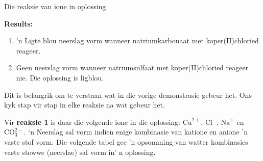 \begin{g_experiment}{Die reaksie van ione in oplossing}
\begin{enumerate}[noitemsep, label=\textbf{\arabic*}. ]
\end{enumerate}
        \par 
      \label{m38719*id340060}\noindent{}\textbf{Results:}
        \newline
      \label{m38719*id340067}\begin{enumerate}[noitemsep, label=\textbf{\arabic*}. ] 
            \label{m38719*uid65}\item 'n Ligte blou neerslag vorm wanneer natriumkarbonaat met koper(II)chloried reageer.
\label{m38719*uid66}\item Geen neerslag vorm wanneer natriumsulfaat met koper(II)chloried reageer nie. Die oplossing is ligblou.
\end{enumerate}
        \par 
\end{g_experiment}
      \label{m38719*id340106}Dit is belangrik om te verstaan wat in die vorige demonstrasie gebeur het.  Ons kyk stap vir stap in elke reaksie na wat gebeur het.\par 
Vir \textbf{reaksie 1} is daar die volgende ione in die oplossing: ${\text{Cu}}^{2+}$, ${\text{Cl}}^{-}$, ${\text{Na}}^{+}$ en $\text{CO}_{3}^{2-}$. ‘n Neerslag sal vorm indien enige kombinasie van katione en anione 'n vaste stof vorm. Die volgende tabel gee 'n opsomming van watter kombinasies vaste stowwe (neerslae) sal vorm in' n oplossing. 
